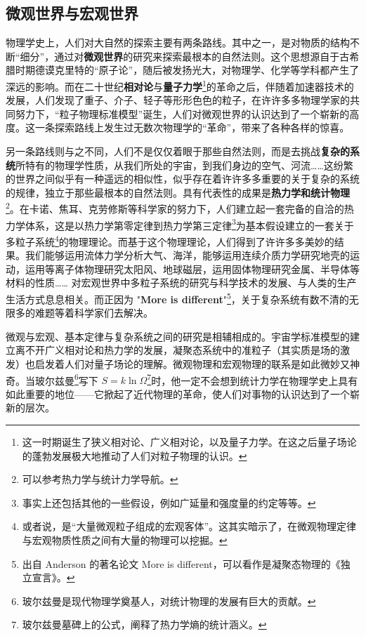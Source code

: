 \subsection{微观世界与宏观世界}
物理学史上，人们对大自然的探索主要有两条路线。其中之一，是对物质的结构不断“细分”，通过对\textbf{微观世界}的研究来探索最根本的自然法则。这个思想源自于古希腊时期德谟克里特的“原子论”，随后被发扬光大，对物理学、化学等学科都产生了深远的影响。而在二十世纪\textbf{相对论}与\textbf{量子力学}\footnote{这一时期诞生了狭义相对论、广义相对论，以及量子力学。在这之后量子场论的蓬勃发展极大地推动了人们对粒子物理的认识。}的革命之后，伴随着加速器技术的发展，人们发现了重子、介子、轻子等形形色色的粒子，在许许多多物理学家的共同努力下，“粒子物理标准模型”诞生，人们对微观世界的认识达到了一个崭新的高度。这一条探索路线上发生过无数次物理学的“革命”，带来了各种各样的惊喜。

另一条路线则与之不同，人们不是仅仅着眼于那些自然法则，而是去挑战\textbf{复杂的系统}所特有的物理学性质，从我们所处的宇宙，到我们身边的空气、河流……这纷繁的世界之间似乎有一种遥远的相似性，似乎存在着许许多多重要的关于复杂的系统的规律，独立于那些最根本的自然法则。具有代表性的成果是\textbf{热力学和统计物理}\footnote{可以参考热力学与统计力学导航。}。在卡诺、焦耳、克劳修斯等科学家的努力下，人们建立起一套完备的自洽的热力学体系，这是以热力学第零定律到热力学第三定律\footnote{事实上还包括其他的一些假设，例如广延量和强度量的约定等等。}为基本假设建立的一套关于多粒子系统\footnote{或者说，是“大量微观粒子组成的宏观客体”。这其实暗示了，在微观物理定律与宏观物质性质之间有大量的物理可以挖掘。}的物理理论。而基于这个物理理论，人们得到了许许多多美妙的结果。我们能够运用流体力学分析大气、海洋，能够运用连续介质力学研究地壳的运动，运用等离子体物理研究太阳风、地球磁层，运用固体物理研究金属、半导体等材料的性质…… 对宏观世界中多粒子系统的研究与科学技术的发展、与人类的生产生活方式息息相关。而正因为 "\textbf{More is different}"\footnote{出自 Anderson 的著名论文 More is different，可以看作是凝聚态物理的《独立宣言》。}，关于复杂系统有数不清的无限多的难题等着科学家们去解决。

微观与宏观、基本定律与复杂系统之间的研究是相辅相成的。宇宙学标准模型的建立离不开广义相对论和热力学的发展，凝聚态系统中的准粒子（其实质是场的激发）也启发着人们对量子场论的理解。微观物理和宏观物理的联系是如此微妙又神奇。当玻尔兹曼\footnote{玻尔兹曼是现代物理学奠基人，对统计物理的发展有巨大的贡献。}写下 $S=k\ln \Omega$\footnote{玻尔兹曼墓碑上的公式，阐释了热力学熵的统计涵义。}时，他一定不会想到统计力学在物理学史上具有如此重要的地位——它掀起了近代物理的革命，使人们对事物的认识达到了一个崭新的层次。
